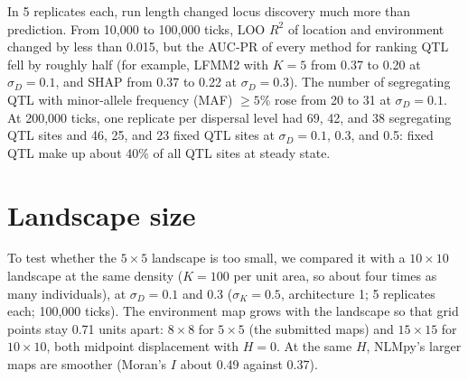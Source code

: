 In 5 replicates each, run length changed locus discovery much more than
prediction. From 10,000 to 100,000 ticks, LOO $R^2$ of location and
environment changed by less than 0.015, but the AUC-PR of every method for
ranking QTL fell by roughly half (for example, LFMM2 with $K=5$ from 0.37 to
0.20 at $\sigma_D=0.1$, and SHAP from 0.37 to 0.22 at $\sigma_D=0.3$). The
number of segregating QTL with minor-allele frequency (MAF) $\geq 5\%$ rose
from 20 to 31 at $\sigma_D=0.1$. At 200,000 ticks, one replicate per
dispersal level had 69, 42, and 38 segregating QTL sites and 46, 25, and 23
fixed QTL sites at $\sigma_D = 0.1$, 0.3, and 0.5: fixed QTL make up about
40\% of all QTL sites at steady state.



\section{Landscape size}
\label{sec:landscape}

To test whether the $5\times5$ landscape is too small, we compared it with
a $10\times10$ landscape at the same density ($K=100$ per unit area, so
about four times as many individuals), at $\sigma_D=0.1$ and 0.3
($\sigma_K=0.5$, architecture 1; 5 replicates each; 100,000 ticks). The
environment map grows with the landscape so that grid points stay 0.71
units apart: $8\times8$ for $5\times5$ (the submitted maps) and
$15\times15$ for $10\times10$, both midpoint displacement with $H=0$. At
the same $H$, NLMpy's larger maps are smoother (Moran's $I$ about 0.49
against 0.37).

